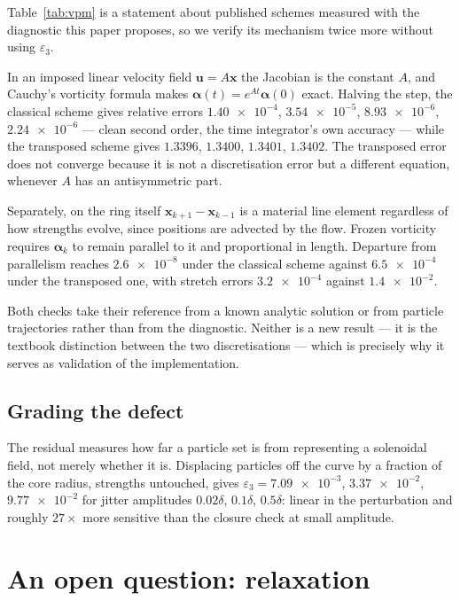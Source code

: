 \documentclass[preprint,12pt,3p]{elsarticle}
\theoremstyle{remark}
\newcommand{\eps}{\varepsilon_3}
\newcommand{\bx}{\mathbf{x}}
\newcommand{\bu}{\mathbf{u}}
\newcommand{\balpha}{\boldsymbol{\alpha}}
\begin{document}
Table~\ref{tab:vpm} is a statement about published schemes measured with the
diagnostic this paper proposes, so we verify its mechanism twice more without
using $\eps$.

In an imposed linear velocity field $\bu = A\bx$ the Jacobian is the constant
$A$, and Cauchy's vorticity formula makes $\balpha(t) = e^{At}\balpha(0)$ exact.
Halving the step, the classical scheme gives relative errors $\num{1.40e-4}$,
$\num{3.54e-5}$, $\num{8.93e-6}$, $\num{2.24e-6}$ --- clean second order, the
time integrator's own accuracy --- while the transposed scheme gives $1.3396$,
$1.3400$, $1.3401$, $1.3402$. The transposed error does not converge because it
is not a discretisation error but a different equation, whenever $A$ has an
antisymmetric part.

Separately, on the ring itself $\bx_{k+1}-\bx_{k-1}$ is a material line element
regardless of how strengths evolve, since positions are advected by the flow.
Frozen vorticity requires $\balpha_k$ to remain parallel to it and proportional
in length. Departure from parallelism reaches $\num{2.6e-8}$ under the classical
scheme against $\num{6.5e-4}$ under the transposed one, with stretch errors
$\num{3.2e-4}$ against $\num{1.4e-2}$.

Both checks take their reference from a known analytic solution or from particle
trajectories rather than from the diagnostic. Neither is a new result --- it is
the textbook distinction between the two discretisations --- which is precisely
why it serves as validation of the implementation.

\subsection{Grading the defect}

The residual measures how far a particle set is from representing a solenoidal
field, not merely whether it is. Displacing particles off the curve by a
fraction of the core radius, strengths untouched, gives $\eps = \num{7.09e-3}$,
$\num{3.37e-2}$, $\num{9.77e-2}$ for jitter amplitudes $0.02\delta$,
$0.1\delta$, $0.5\delta$: linear in the perturbation and roughly $27\times$ more
sensitive than the closure check at small amplitude.

\section{An open question: relaxation}
\label{sec:relaxation}
\end{document}

